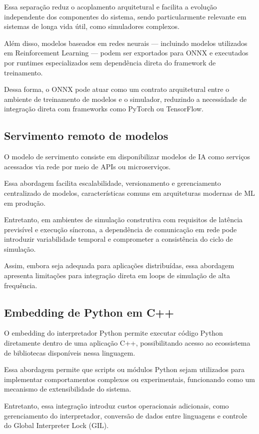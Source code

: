 Essa separação reduz o acoplamento arquitetural e facilita a evolução independente dos
componentes do sistema, sendo particularmente relevante em sistemas de longa vida útil,
como simuladores complexos.

Além disso, modelos baseados em redes neurais — incluindo modelos utilizados em
Reinforcement Learning — podem ser exportados para ONNX e executados por runtimes
especializados sem dependência direta do framework de treinamento.

Dessa forma, o ONNX pode atuar como um contrato arquitetural entre o ambiente de treinamento
de modelos e o simulador, reduzindo a necessidade de integração direta com frameworks como
PyTorch ou TensorFlow.


\subsection{Servimento remoto de modelos}

O modelo de servimento consiste em disponibilizar modelos de IA como serviços acessados via
rede por meio de APIs ou microserviços.

Essa abordagem facilita escalabilidade, versionamento e gerenciamento centralizado de modelos,
características comuns em arquiteturas modernas de ML em produção.

Entretanto, em ambientes de simulação construtiva com requisitos de latência previsível e
execução síncrona, a dependência de comunicação em rede pode introduzir variabilidade
temporal e comprometer a consistência do ciclo de simulação.

Assim, embora seja adequada para aplicações distribuídas, essa abordagem apresenta limitações
para integração direta em loops de simulação de alta frequência.


\subsection{Embedding de Python em C++}

O embedding do interpretador Python permite executar código Python diretamente dentro de uma
aplicação C++, possibilitando acesso ao ecossistema de bibliotecas disponíveis nessa linguagem.

Essa abordagem permite que scripts ou módulos Python sejam utilizados para implementar
comportamentos complexos ou experimentais, funcionando como um mecanismo de extensibilidade
do sistema.

Entretanto, essa integração introduz custos operacionais adicionais, como gerenciamento do
interpretador, conversão de dados entre linguagens e controle do Global Interpreter Lock (GIL).

